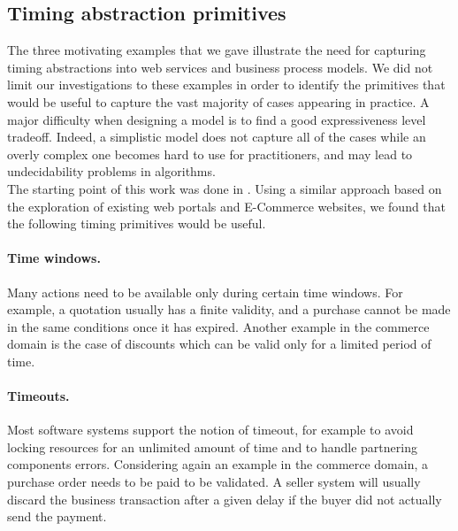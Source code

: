 
\subsection{Timing abstraction primitives}


The three motivating examples that we gave illustrate the need for capturing timing abstractions into web services and business process models. We did not limit our investigations to these examples in order to identify the primitives that would be useful to capture the vast majority of cases appearing in practice. A major difficulty when designing a model is to find a good expressiveness level tradeoff. Indeed, a simplistic model does not capture all of the cases while an overly complex one becomes hard to use for practitioners, and may lead to undecidability problems in algorithms.\\

The starting point of this work was done in \cite{BCT-CAISE03,KBBB+04}. Using a similar approach based on the exploration of existing web portals and E-Commerce websites, we found that the following timing primitives would be useful.

\paragraph{Time windows.} Many actions need to be available only during certain time windows. For example, a quotation usually has a finite validity, and a purchase cannot be made in the same conditions once it has expired. Another example in the commerce domain is the case of discounts which can be valid only for a limited period of time.

\paragraph{Timeouts.} Most software systems support the notion of timeout, for example to avoid locking resources for an unlimited amount of time and to handle partnering components errors. Considering again an example in the commerce domain, a purchase order needs to be paid to be validated. A seller system will usually discard the business transaction after a given delay if the buyer did not actually send the payment.

